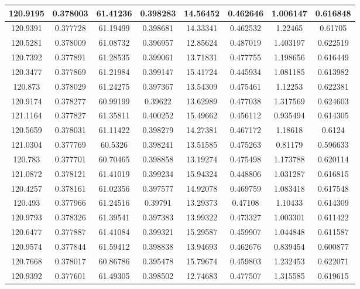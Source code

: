 \documentclass[preprint,review,11pt]{elsarticle}
\begin{document}
\begin{longtable}{|c|c|c|c|c|c|c|c|}
				120.9195 & 0.378003 & 61.41236 & 0.398283 & 14.56452 & 0.462646 & 1.006147 & 0.616848 \\ \hline
				120.9391 & 0.377728 & 61.19499 & 0.398681 & 14.33341 & 0.462532 & 1.22465  & 0.61705  \\ \hline
				120.5281 & 0.378009 & 61.08732 & 0.396957 & 12.85624 & 0.487019 & 1.403197 & 0.622519 \\ \hline
				120.7392 & 0.377891 & 61.28535 & 0.399061 & 13.71831 & 0.477755 & 1.198656 & 0.616449 \\ \hline
				120.3477 & 0.377869 & 61.21984 & 0.399147 & 15.41724 & 0.445934 & 1.081185 & 0.613982 \\ \hline
				120.873  & 0.378029 & 61.24275 & 0.397367 & 13.54309 & 0.475461 & 1.12253  & 0.622381 \\ \hline
				120.9174 & 0.378277 & 60.99199 & 0.39622  & 13.62989 & 0.477038 & 1.317569 & 0.624603 \\ \hline
				121.1164 & 0.377827 & 61.35811 & 0.400252 & 15.49662 & 0.456112 & 0.935494 & 0.614305 \\ \hline
				120.5659 & 0.378031 & 61.11422 & 0.398279 & 14.27381 & 0.467172 & 1.18618  & 0.6124   \\ \hline
				121.0304 & 0.377769 & 60.5326  & 0.398241 & 13.51585 & 0.475263 & 0.81179  & 0.596633 \\ \hline
				120.783  & 0.377701 & 60.70465 & 0.398858 & 13.19274 & 0.475498 & 1.173788 & 0.620114 \\ \hline
				121.0872 & 0.378121 & 61.41019 & 0.399234 & 15.94324 & 0.448806 & 1.031287 & 0.616815 \\ \hline
				120.4257 & 0.378161 & 61.02356 & 0.397577 & 14.92078 & 0.469759 & 1.083418 & 0.617548 \\ \hline
				120.493  & 0.377966 & 61.24516 & 0.39791  & 13.29373 & 0.47108  & 1.10433  & 0.614309 \\ \hline
				120.9793 & 0.378326 & 61.39541 & 0.397383 & 13.99322 & 0.473327 & 1.003301 & 0.611422 \\ \hline
				120.6477 & 0.377887 & 61.41084 & 0.399321 & 15.29587 & 0.459907 & 1.044848 & 0.611587 \\ \hline
				120.9574 & 0.377844 & 61.59412 & 0.398838 & 13.94693 & 0.462676 & 0.839454 & 0.600877 \\ \hline
				120.7668 & 0.378017 & 60.86786 & 0.395478 & 15.79674 & 0.459803 & 1.232453 & 0.622071 \\ \hline
				120.9392 & 0.377601 & 61.49305 & 0.398502 & 12.74683 & 0.477507 & 1.315585 & 0.619615 \\ \hline

\end{longtable}
\end{document}
